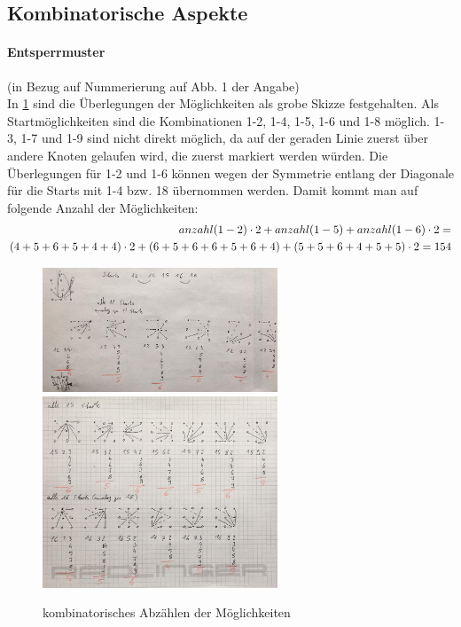\subsection{Kombinatorische Aspekte}
\paragraph{Entsperrmuster}
(in Bezug auf Nummerierung auf Abb. 1 der Angabe) \\

In \ref{bild1} sind die Überlegungen der Möglichkeiten als grobe Skizze festgehalten. Als Startmöglichkeiten sind die Kombinationen 1-2, 1-4, 1-5, 1-6 und 1-8 möglich. 1-3, 1-7 und 1-9 sind nicht direkt möglich, da auf der geraden Linie zuerst über andere Knoten gelaufen wird, die zuerst markiert werden würden. Die Überlegungen für 1-2 und 1-6 können wegen der Symmetrie entlang der Diagonale für die Starts mit 1-4 bzw. 18 übernommen werden. Damit kommt man auf folgende Anzahl der Möglichkeiten:
\begin{equation}
\centering
\begin{aligned}
anzahl(1-2) \cdot 2 + anzahl(1-5) + anzahl(1-6) \cdot 2 = \\
(4+5+6+5+4+4) \cdot 2 + (6+5+6+6+5+6+4) + (5+5+6+4+5+5) \cdot 2 = 154
\end{aligned}
\end{equation}

\begin{figure}
\includegraphics[width=7cm]{bilder/1.jpeg}
\includegraphics[width=7cm]{bilder/2.jpeg}
\centering
\caption{kombinatorisches Abzählen der Möglichkeiten}
\label{bild1}
\end{figure}

